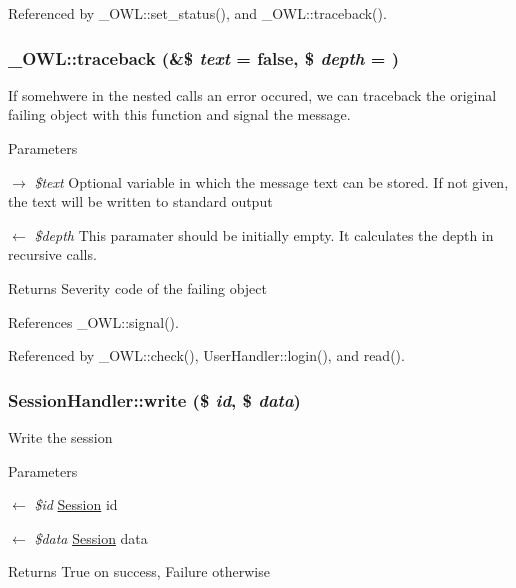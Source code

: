 Referenced by \_\-OWL::set\_\-status(), and \_\-OWL::traceback().

\subsubsection[{traceback}]{\setlength{\rightskip}{0pt plus 5cm}\_\-OWL::traceback (\&\$ {\em text} = {\ttfamily false}, \/  \$ {\em depth} = {})}\label{class__OWL_aa29547995d6741b7d2b90c1d4ea99a13}
If somehwere in the nested calls an error occured, we can traceback the original failing object with this function and signal the message.


\begin{DoxyParams}{Parameters}
\item[\mbox{$\rightarrow$} {\em \$text}]Optional variable in which the message text can be stored. If not given, the text will be written to standard output \item[\mbox{$\leftarrow$} {\em \$depth}]This paramater should be initially empty. It calculates the depth in recursive calls. \end{DoxyParams}
\begin{DoxyReturn}{Returns}
Severity code of the failing object 
\end{DoxyReturn}


References \_\-OWL::signal().



Referenced by \_\-OWL::check(), UserHandler::login(), and read().

\subsubsection[{write}]{\setlength{\rightskip}{0pt plus 5cm}SessionHandler::write (\$ {\em id}, \/  \$ {\em data})}\label{classSessionHandler_ab59071ef0d3deee2472c6916471bd9f5}
Write the session


\begin{DoxyParams}{Parameters}
\item[\mbox{$\leftarrow$} {\em \$id}]\hyperlink{classSession}{Session} id \item[\mbox{$\leftarrow$} {\em \$data}]\hyperlink{classSession}{Session} data \end{DoxyParams}
\begin{DoxyReturn}{Returns}
True on success, Failure otherwise 
\end{DoxyReturn}



